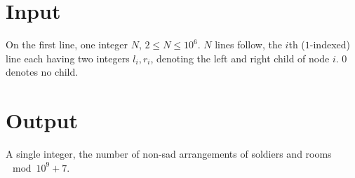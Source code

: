 \section*{Input}
On the first line, one integer $N$, $2 \leq N \leq 10^6$.
$N$ lines follow, the $i$th ($1$-indexed) line each having two integers $l_i, r_i$, denoting the left and right child of node $i$. $0$ denotes no child.

\section*{Output}
A single integer, the number of non-sad arrangements of soldiers and rooms $\mod 10^9 + 7$.
